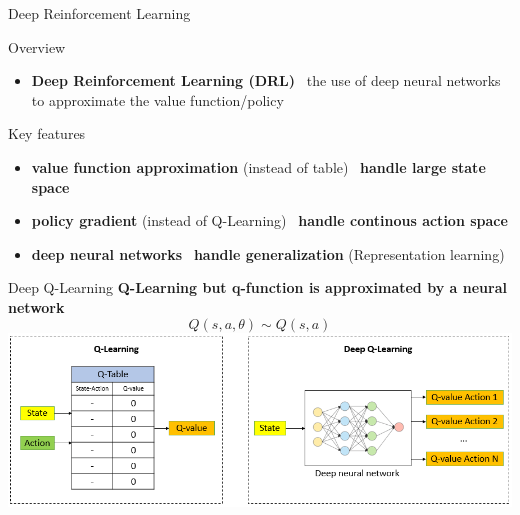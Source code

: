 \documentclass[presentation, 9pt]{beamer}\mode<presentation>{\usetheme{AMSBolognaFC}}
\begin{document}
\begin{frame}{Deep Reinforcement Learning}
	\centering
	\begin{block}{Overview}
		\begin{itemize}
			\item \textbf{Deep Reinforcement Learning (DRL)} \faArrowRight \, the use of deep neural networks to approximate the value function/policy
		\end{itemize}
	\end{block}
	
	\begin{alertblock}{Key features}
		\begin{itemize}
			\item \textbf{value function approximation} (instead of table) \faArrowRight \, \textbf{handle large state space}
			\item \textbf{policy gradient} (instead of Q-Learning) \faArrowRight \, \textbf{handle continous action space}
			\item \textbf{deep neural networks} \faArrowRight \, \textbf{handle generalization} (Representation learning)
		\end{itemize}
	\end{alertblock}
\end{frame}
\begin{frame}{Deep Q-Learning}
	\centering
	\textbf{Q-Learning but q-function is approximated by a neural network}
	$$ Q(s, a, \theta) \sim Q(s, a) $$
	\includegraphics[width=\textwidth]{img/dql-vs-ql-1.png}
\end{frame}
\end{document}
